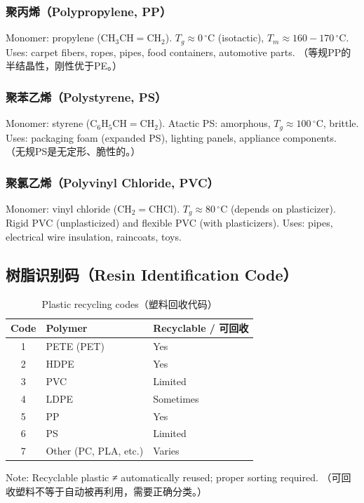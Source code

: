 \documentclass[12pt,a4paper]{ctexart}
\begin{document}
\subsubsection{聚丙烯（Polypropylene, PP）}
Monomer: propylene ($\mathrm{CH_3CH=CH_2}$). $T_g \approx 0\,^\circ$C (isotactic), $T_m \approx 160-170\,^\circ$C. Uses: carpet fibers, ropes, pipes, food containers, automotive parts. （等规PP的半结晶性，刚性优于PE。）

\subsubsection{聚苯乙烯（Polystyrene, PS）}
Monomer: styrene ($\mathrm{C_6H_5CH=CH_2}$). Atactic PS: amorphous, $T_g \approx 100\,^\circ$C, brittle. Uses: packaging foam (expanded PS), lighting panels, appliance components. （无规PS是无定形、脆性的。）

\subsubsection{聚氯乙烯（Polyvinyl Chloride, PVC）}
Monomer: vinyl chloride ($\mathrm{CH_2=CHCl}$). $T_g \approx 80\,^\circ$C (depends on plasticizer). Rigid PVC (unplasticized) and flexible PVC (with plasticizers). Uses: pipes, electrical wire insulation, raincoats, toys.

\subsection{树脂识别码（Resin Identification Code）}
\begin{table}[H]
\centering
\begin{tabular}{cll}
\toprule
\textbf{Code} & \textbf{Polymer} & \textbf{Recyclable / 可回收} \\
\midrule
1 & PETE (PET) & Yes \\
2 & HDPE & Yes \\
3 & PVC & Limited \\
4 & LDPE & Sometimes \\
5 & PP & Yes \\
6 & PS & Limited \\
7 & Other (PC, PLA, etc.) & Varies \\
\bottomrule
\end{tabular}
\caption{Plastic recycling codes（塑料回收代码）}
\end{table}
Note: Recyclable plastic ≠ automatically reused; proper sorting required. （可回收塑料不等于自动被再利用，需要正确分类。）
\end{document}
